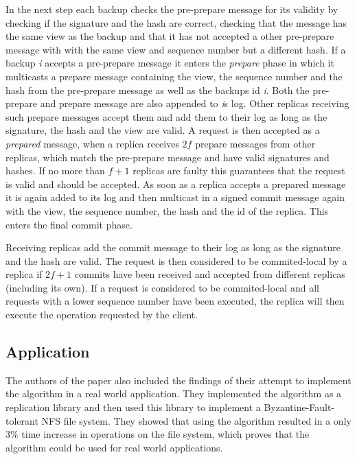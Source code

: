 In the next step each backup checks the pre-prepare message for its validity by checking if the signature and the hash are correct, checking that the message has the same view as the backup and
that it has not accepted a other pre-prepare message with with the same view and sequence number but a different hash. If a backup \textit{i} accepts a pre-prepare message it enters the \textit{prepare}
phase in which it multicasts a prepare message containing the view, the sequence number and the hash from the pre-prepare message as well as the backups id \textit{i}. Both the pre-prepare and
prepare message are also appended to \textit{i}s log. Other replicas receiving such prepare messages accept them and add them to their log as long as the signature, the hash and the view are
valid. A request is then accepted as a \textit{prepared} message, when a replica receives $2f$ prepare messages from other replicas, which match the pre-prepare message and have valid signatures
and hashes. If no more than $f+1$ replicas are faulty this guarantees that the request is valid and should be accepted. As soon as a replica accepts a prepared message it is again added to its log
and then multicast in a signed commit message again with the view, the sequence number, the hash and the id of the replica. This enters the final commit phase.

Receiving replicas add the commit
message to their log as long as the signature and the hash are valid. The request is then considered to be commited-local by a replica if $2f+1$ commits have been received and accepted from
different replicas (including its own). If a request is considered to be commited-local and all requests with a lower sequence number have been executed, the replica will then execute the operation
requested by the client.

\subsection{Application}

The authors of the paper also included the findings of their attempt to implement the algorithm in a real world application. They implemented the algorithm as a replication library and then used this
library to implement a Byzantine-Fault-tolerant NFS file system. They showed that using the algorithm resulted in a only 3\% time increase in operations on the file system, which proves
that the algorithm could be used for real world applications. 
